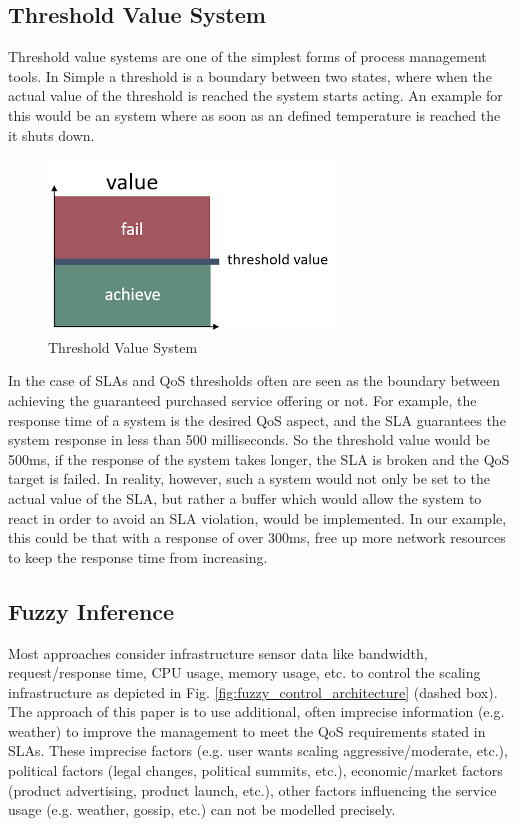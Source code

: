 \subsection{Threshold Value System}
Threshold value systems are one of the simplest forms of process management tools. In Simple a threshold is a boundary between two states, where when the actual value of the threshold is reached the system starts acting. An example for this would be an system where as soon as an defined temperature is reached the it shuts down. 

\begin{figure}[ht]
		\centering
	\centering
	\includegraphics[width=0.7\linewidth]{chapters/chapter5/fig/threshold}
	\caption{Threshold Value System}
	\label{fig:threshold}
\end{figure}

In the case of SLAs and QoS thresholds often are seen as the boundary between achieving the guaranteed purchased service offering or not. For example, the response time of a system is the desired QoS aspect, and the SLA guarantees the system response in less than 500 milliseconds. So the threshold value would be 500ms, if the response of the system takes longer, the SLA is broken and the QoS target is failed. In reality, however, such a system would not only be set to the actual value of the SLA, but rather a buffer which would allow the system to react in order to avoid an SLA violation, would be implemented. In our example, this could be that with a response of over 300ms, free up more network resources to keep the response time from increasing.

\subsection*{Fuzzy Inference }
Most approaches consider infrastructure sensor data like bandwidth, request/response time, CPU usage, memory usage, etc. to control the scaling infrastructure as depicted in Fig. \ref{fig:fuzzy_control_architecture} (dashed box). The approach of this paper is to use additional, often imprecise information (e.g. weather) to improve the management to meet the QoS requirements stated in SLAs. These imprecise factors (e.g. user wants scaling aggressive/moderate, etc.), political factors (legal changes, political summits, etc.), economic/market factors (product advertising, product launch, etc.), other factors influencing the service usage (e.g. weather, gossip, etc.) can not be modelled precisely.

